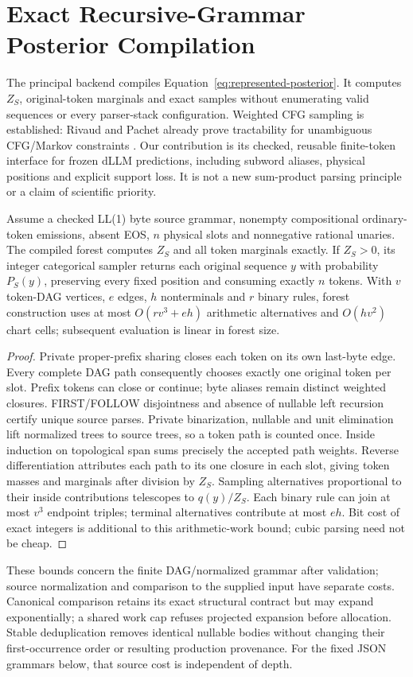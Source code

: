 \section{Exact Recursive-Grammar Posterior Compilation}
\label{sec:cfg-posterior}

The principal backend compiles Equation~\ref{eq:represented-posterior}.
It computes $Z_S$, original-token marginals and exact samples without enumerating
valid sequences or every parser-stack configuration. Weighted CFG sampling is
established: Rivaud and Pachet already prove tractability for unambiguous
CFG/Markov constraints \cite{rivaud2017sampling}. Our contribution is its checked,
reusable finite-token interface for frozen dLLM predictions, including subword
aliases, physical positions and explicit support loss. It is not a new
sum-product parsing principle or a claim of scientific priority.

\begin{theorem}
Assume a checked LL(1) byte source grammar, nonempty compositional ordinary-token
emissions, absent EOS, $n$ physical slots and nonnegative rational unaries.
The compiled forest computes $Z_S$ and all token marginals exactly. If $Z_S>0$,
its integer categorical sampler returns each original sequence $y$ with
probability $P_S(y)$, preserving every fixed position and consuming exactly $n$
tokens. With $v$ token-DAG vertices, $e$ edges, $h$ nonterminals and $r$ binary
rules, forest construction uses at most $O(rv^3+eh)$ arithmetic alternatives and
$O(hv^2)$ chart cells; subsequent evaluation is linear in forest size.
\label{thm:cfg-posterior}
\end{theorem}
\begin{proof}
Private proper-prefix sharing closes each token on its own last-byte edge.
Every complete DAG path consequently chooses exactly one original token per
slot. Prefix tokens can close or continue; byte aliases remain distinct weighted
closures. FIRST/FOLLOW disjointness and absence of nullable left recursion
certify unique source parses. Private binarization, nullable and unit elimination
lift normalized trees to source trees, so a token path is counted once.
Inside induction on topological span sums precisely the accepted path weights.
Reverse differentiation attributes each path to its one closure in each slot,
giving token masses and marginals after division by $Z_S$. Sampling alternatives
proportional to their inside contributions telescopes to $q(y)/Z_S$.
Each binary rule can join at most $v^3$ endpoint triples; terminal alternatives
contribute at most $eh$. Bit cost of exact integers is additional to this
arithmetic-work bound; cubic parsing need not be cheap.
\end{proof}
These bounds concern the finite DAG/normalized grammar after validation;
source normalization and comparison to the supplied input have separate costs.
Canonical comparison retains its exact structural contract but may expand
exponentially; a shared work cap refuses projected expansion before allocation.
Stable deduplication removes identical nullable bodies without changing their
first-occurrence order or resulting production provenance.
For the fixed JSON grammars below, that source cost is independent of depth.

